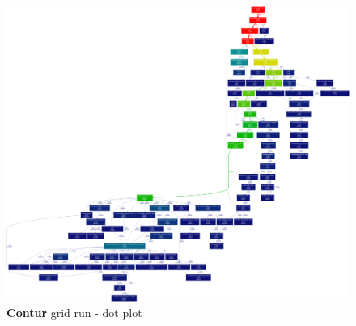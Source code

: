 \begin{figure}[H]
\centering
\includegraphics[scale=0.12]{plots/initial_contur_grid_two.png}
\caption{\textbf{Contur} grid run - dot plot}
\label{fig:grid_yoda_start_profile_dot}
\end{figure}




